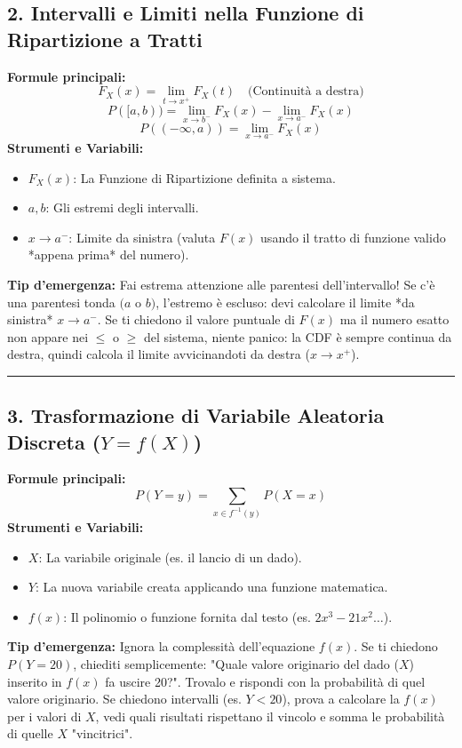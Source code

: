 \documentclass[12pt, a4paper]{article}
\begin{document}
\subsection*{2. Intervalli e Limiti nella Funzione di Ripartizione a Tratti}
\textbf{Formule principali:}
$$ F_X(x) = \lim_{t \to x^+} F_X(t) \quad \text{(Continuità a destra)} $$
$$ P([a, b)) = \lim_{x \to b^-} F_X(x) - \lim_{x \to a^-} F_X(x) $$
$$ P((-\infty, a)) = \lim_{x \to a^-} F_X(x) $$
\textbf{Strumenti e Variabili:}
\begin{itemize}
    \item $F_X(x)$: La Funzione di Ripartizione definita a sistema.
    \item $a, b$: Gli estremi degli intervalli.
    \item $x \to a^-$: Limite da sinistra (valuta $F(x)$ usando il tratto di funzione valido *appena prima* del numero).
\end{itemize}
\textbf{Tip d'emergenza:} Fai estrema attenzione alle parentesi dell'intervallo! Se c'è una parentesi tonda $(a$ o $b)$, l'estremo è escluso: devi calcolare il limite *da sinistra* $x \to a^-$. Se ti chiedono il valore puntuale di $F(x)$ ma il numero esatto non appare nei $\le$ o $\ge$ del sistema, niente panico: la CDF è sempre continua da destra, quindi calcola il limite avvicinandoti da destra ($x \to x^+$).

\vspace{0.3cm}\hrule\vspace{0.3cm}

\subsection*{3. Trasformazione di Variabile Aleatoria Discreta ($Y = f(X)$)}
\textbf{Formule principali:}
$$ P(Y=y) = \sum_{x \in f^{-1}(y)} P(X=x) $$
\textbf{Strumenti e Variabili:}
\begin{itemize}
    \item $X$: La variabile originale (es. il lancio di un dado).
    \item $Y$: La nuova variabile creata applicando una funzione matematica.
    \item $f(x)$: Il polinomio o funzione fornita dal testo (es. $2x^3 - 21x^2 \dots$).
\end{itemize}
\textbf{Tip d'emergenza:} Ignora la complessità dell'equazione $f(x)$. Se ti chiedono $P(Y = 20)$, chiediti semplicemente: "Quale valore originario del dado ($X$) inserito in $f(x)$ fa uscire 20?". Trovalo e rispondi con la probabilità di quel valore originario. Se chiedono intervalli (es. $Y < 20$), prova a calcolare la $f(x)$ per i valori di $X$, vedi quali risultati rispettano il vincolo e somma le probabilità di quelle $X$ "vincitrici". 
\end{document}
